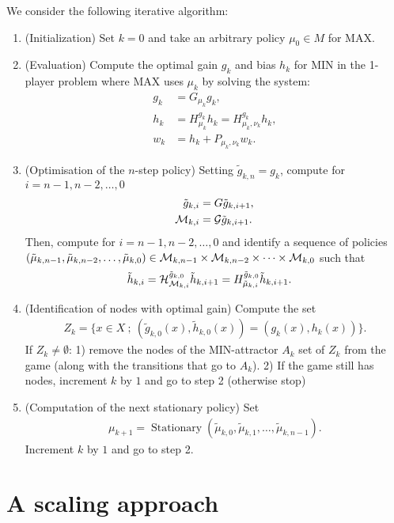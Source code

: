 \documentclass{article}
\def\G{{\cal G}}
\def\H{{\cal H}}
\def\M{{\cal M}}
\def\stat{\mathop{Stationary}}
\begin{document}
We consider the following iterative algorithm:
\begin{enumerate}
\item (Initialization) Set $k=0$ and take an arbitrary policy $\mu_0 \in M$ for MAX.
\item (Evaluation) Compute the optimal gain $g_k$ and bias $h_k$ for MIN in the 1-player problem where MAX uses $\mu_k$ by solving the system:
  \begin{align}
    g_k & = G_{\mu_k} g_k, \\
    h_k & = H_{\mu_k}^{g_k}h_k = H^{g_k}_{\mu_k,\nu_k}h_k, \\
    w_k & = h_k + P_{\mu_k,\nu_k} w_k.
  \end{align}
\item (Optimisation of the $n$-step policy) Setting $\tilde g_{k,n}=g_k$, compute for $i=n-1,n-2,\dots,0$
  \begin{align}
    \tilde g_{k,i} & = G \tilde g_{k,i+1}, \\
    \M_{k,i} & = \G \tilde g_{k,i+1}.
  \end{align}
  Then, compute for $i=n-1,n-2,\dots,0$ and identify a sequence of policies $(\tilde \mu_{k,n-1},\tilde \mu_{k,n-2},\dots,\tilde \mu_{k,0}) \in \M_{k,n-1} \times \M_{k,n-2} \times \dots \times \M_{k,0}$ such that
  \begin{align}
    \tilde h_{k,i} & = \H_{\M_{k,i}}^{\tilde g_{k,0}} \tilde h_{k,i+1} = H_{\tilde \mu_{k,i}}^{\tilde g_{k,0}} \tilde h_{k,i+1}. 
  \end{align}
  \item (Identification of nodes with optimal gain) Compute the set
    \begin{align}
      Z_k = \{ x \in X ~;~ (\tilde g_{k,0}(x),\tilde h_{k,0}(x))=(g_k(x),h_k(x)) \}.
    \end{align}
    If $Z_k \neq \emptyset$: 1) remove the nodes of the MIN-attractor $A_k$ set of $Z_k$ from the game (along with the transitions that go to $A_k$). 2) If the game still has nodes,  increment $k$ by $1$ and go to step 2 (otherwise stop)
  \item (Computation of the next stationary policy) Set
    \begin{align}
      \mu_{k+1} = \stat(\tilde \mu_{k,0},\tilde \mu_{k,1},\dots,\tilde \mu_{k,n-1}).
    \end{align}
    Increment $k$ by $1$ and go to step 2.
\end{enumerate}

\section{A scaling approach}
\label{scaling}
\end{document}
